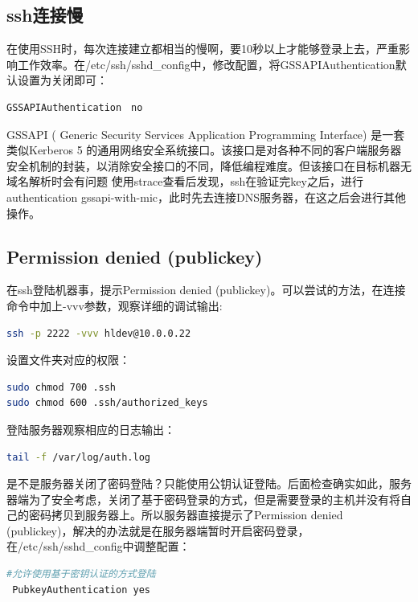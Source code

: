 \documentclass[letter]{book}
\begin{document}
\subsection{ssh连接慢}

在使用SSH时，每次连接建立都相当的慢啊，要10秒以上才能够登录上去，严重影响工作效率。在/etc/ssh/sshd\_config中，修改配置，将GSSAPIAuthentication默认设置为关闭即可：

\begin{lstlisting}[language=Bash]
GSSAPIAuthentication　no
\end{lstlisting}

GSSAPI ( Generic Security Services Application Programming Interface) 是一套类似Kerberos 5 的通用网络安全系统接口。该接口是对各种不同的客户端服务器安全机制的封装，以消除安全接口的不同，降低编程难度。但该接口在目标机器无域名解析时会有问题
使用strace查看后发现，ssh在验证完key之后，进行authentication gssapi-with-mic，此时先去连接DNS服务器，在这之后会进行其他操作。

\subsection{Permission denied (publickey)}

在ssh登陆机器事，提示Permission denied (publickey)。可以尝试的方法，在连接命令中加上-vvv参数，观察详细的调试输出:

\begin{lstlisting}[language=Bash]
ssh -p 2222 -vvv hldev@10.0.0.22
\end{lstlisting}

设置文件夹对应的权限：

\begin{lstlisting}[language=Bash]
sudo chmod 700 .ssh
sudo chmod 600 .ssh/authorized_keys
\end{lstlisting}

登陆服务器观察相应的日志输出：

\begin{lstlisting}[language=Bash]
tail -f /var/log/auth.log
\end{lstlisting}

是不是服务器关闭了密码登陆？只能使用公钥认证登陆。后面检查确实如此，服务器端为了安全考虑，关闭了基于密码登录的方式，但是需要登录的主机并没有将自己的密码拷贝到服务器上。所以服务器直接提示了Permission denied (publickey)，解决的办法就是在服务器端暂时开启密码登录，在/etc/ssh/sshd\_config中调整配置：

\begin{lstlisting}[language=Bash]
#允许使用基于密钥认证的方式登陆
 PubkeyAuthentication yes 
\end{lstlisting}
\end{document}
